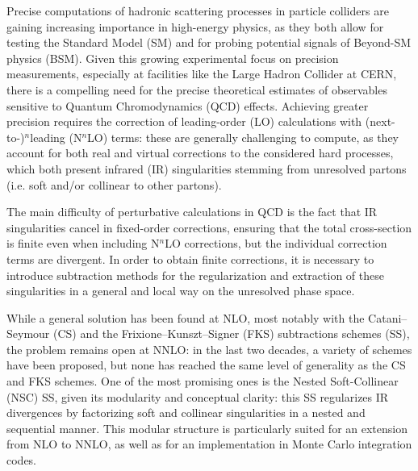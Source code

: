 



Precise computations of hadronic scattering processes in particle colliders are gaining increasing importance in high-energy physics, as they both allow for testing the Standard Model (SM) and for probing potential signals of Beyond-SM physics (BSM). Given this growing experimental focus on precision measurements, especially at facilities like the Large Hadron Collider at CERN, there is a compelling need for the precise theoretical estimates of observables sensitive to Quantum Chromodynamics (QCD) effects. Achieving greater precision requires the correction of leading-order (LO) calculations with (next-to-)$ ^n $leading (N$ ^n $LO) terms: these are generally challenging to compute, as they account for both real and virtual corrections to the considered hard processes, which both present infrared (IR) singularities stemming from unresolved partons (i.e. soft and/or collinear to other partons).

The main difficulty of perturbative calculations in QCD is the fact that IR singularities cancel in fixed-order corrections, ensuring that the total cross-section is finite even when including N$ ^n $LO corrections, but the individual correction terms are divergent. In order to obtain finite corrections, it is necessary to introduce subtraction methods for the regularization and extraction of these singularities in a general and local way on the unresolved phase space.

While a general solution has been found at NLO, most notably with the Catani--Seymour (CS) and the Frixione--Kunszt--Signer (FKS) subtractions schemes (SS), the problem remains open at NNLO: in the last two decades, a variety of schemes have been proposed, but none has reached the same level of generality as the CS and FKS schemes. One of the most promising ones is the Nested Soft-Collinear (NSC) SS, given its modularity and conceptual clarity: this SS regularizes IR divergences by factorizing soft and collinear singularities in a nested and sequential manner. This modular structure is particularly suited for an extension from NLO to NNLO, as well as for an implementation in Monte Carlo integration codes.

